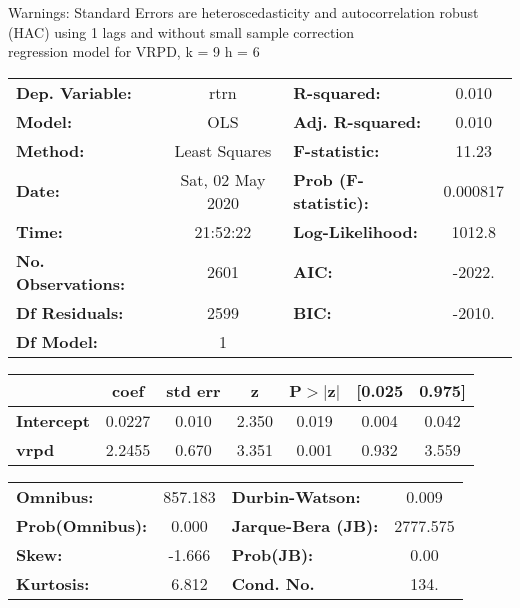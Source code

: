 Warnings: \newline
 [1] Standard Errors are heteroscedasticity and autocorrelation robust (HAC) using 1 lags and without small sample correction\\ 

regression model for VRPD, k = 9 h = 6\begin{center}
\begin{tabular}{lclc}
\toprule
\textbf{Dep. Variable:}    &       rtrn       & \textbf{  R-squared:         } &     0.010   \\
\textbf{Model:}            &       OLS        & \textbf{  Adj. R-squared:    } &     0.010   \\
\textbf{Method:}           &  Least Squares   & \textbf{  F-statistic:       } &     11.23   \\
\textbf{Date:}             & Sat, 02 May 2020 & \textbf{  Prob (F-statistic):} &  0.000817   \\
\textbf{Time:}             &     21:52:22     & \textbf{  Log-Likelihood:    } &    1012.8   \\
\textbf{No. Observations:} &        2601      & \textbf{  AIC:               } &    -2022.   \\
\textbf{Df Residuals:}     &        2599      & \textbf{  BIC:               } &    -2010.   \\
\textbf{Df Model:}         &           1      & \textbf{                     } &             \\
\bottomrule
\end{tabular}
\begin{tabular}{lcccccc}
                   & \textbf{coef} & \textbf{std err} & \textbf{z} & \textbf{P$> |$z$|$} & \textbf{[0.025} & \textbf{0.975]}  \\
\midrule
\textbf{Intercept} &       0.0227  &        0.010     &     2.350  &         0.019        &        0.004    &        0.042     \\
\textbf{vrpd}      &       2.2455  &        0.670     &     3.351  &         0.001        &        0.932    &        3.559     \\
\bottomrule
\end{tabular}
\begin{tabular}{lclc}
\textbf{Omnibus:}       & 857.183 & \textbf{  Durbin-Watson:     } &    0.009  \\
\textbf{Prob(Omnibus):} &   0.000 & \textbf{  Jarque-Bera (JB):  } & 2777.575  \\
\textbf{Skew:}          &  -1.666 & \textbf{  Prob(JB):          } &     0.00  \\
\textbf{Kurtosis:}      &   6.812 & \textbf{  Cond. No.          } &     134.  \\
\bottomrule
\end{tabular}
\end{center}

